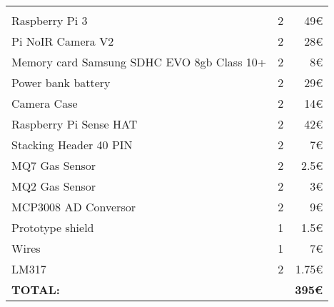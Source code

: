\begin{tabular}{ |p{}P{.1\textwidth}r|}
	\hline
	 \\
	\hline
	\hline
		& 	&  \\
	\hline
	Raspberry Pi 3 					& 2 	& 49\euro{} \\ 
	\hline
	Pi NoIR Camera V2 				& 2 	& 28\euro{} \\ 
	\hline
	Memory card Samsung SDHC
	EVO 8gb Class 10+ 				& 2		& 8\euro{} \\ 
	\hline
	Power bank battery 				& 2 	& 29\euro{} \\ 
	\hline
	Camera Case		 				& 2 	& 14\euro{} \\ 
	\hline
	Raspberry Pi Sense HAT			& 2 	& 42\euro{} \\ 
	\hline
	Stacking Header 40 PIN 			& 2 	& 7\euro{} \\ 
	\hline
	MQ7 Gas Sensor		 			& 2 	& 2.5\euro{} \\ 
	\hline
	MQ2 Gas Sensor 					& 2 	& 3\euro{} \\ 
	\hline
	MCP3008 AD Conversor			& 2 	& 9\euro{} \\ 
	\hline
	Prototype shield  				& 1 	& 1.5\euro{} \\ 
	\hline
	Wires 							& 1 	& 7\euro{} \\ 
	\hline
	LM317 							& 2 	& 1.75\euro{} \\ 
	
	\Xhline{2\arrayrulewidth}
	\textbf{TOTAL:} &  		& \textbf{395\euro{}} \\ 
	\hline

\end{tabular}
